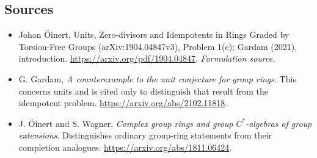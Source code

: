 \documentclass[11pt]{article}
\begin{document}
\subsection{Sources}
\begin{itemize}
\item[S1]Johan Öinert, Units, Zero-divisors and Idempotents in Rings Graded by Torsion-Free Groups (arXiv:1904.04847v3), Problem 1(c); Gardam (2021), introduction.
\url{https://arxiv.org/pdf/1904.04847}.
\textit{Formulation source.}
\item[E1]G. Gardam, \textit{A counterexample to the unit conjecture for group rings}. This concerns units and is cited only to distinguish that result from the idempotent problem.
\url{https://arxiv.org/abs/2102.11818}.
\item[E2]J. \"Oinert and S. Wagner, \textit{Complex group rings and group $C^*$-algebras of group extensions}. Distinguishes ordinary group-ring statements from their completion analogues.
\url{https://arxiv.org/abs/1811.06424}.

\end{itemize}
\end{document}
